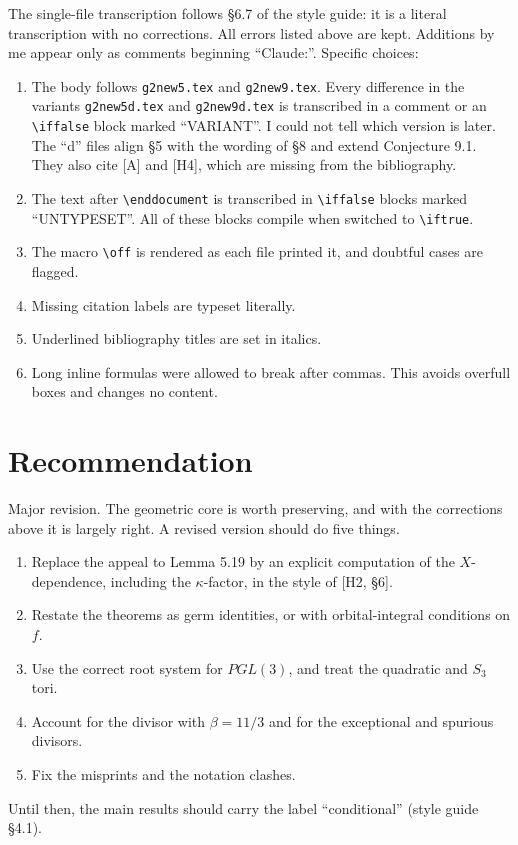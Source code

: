 \documentclass[12pt,letterpaper]{article}
\theoremstyle{definition}
\begin{document}
The single-file transcription follows \S6.7 of the style guide: it is a
literal transcription with no corrections. All errors listed above are kept.
Additions by me appear only as comments beginning ``Claude:''. Specific
choices:
\begin{enumerate}
\item The body follows \texttt{g2new5.tex} and \texttt{g2new9.tex}. Every
difference in the variants \texttt{g2new5d.tex} and \texttt{g2new9d.tex} is
transcribed in a comment or an \verb|\iffalse| block marked ``VARIANT''. I
could not tell which version is later. The ``d'' files align \S5 with the
wording of \S8 and extend Conjecture 9.1. They also cite [A] and [H4], which
are missing from the bibliography.
\item The text after \verb|\enddocument| is transcribed in \verb|\iffalse|
blocks marked ``UNTYPESET''. All of these blocks compile when switched to
\verb|\iftrue|.
\item The macro \verb|\off| is rendered as each file printed it, and doubtful
cases are flagged.
\item Missing citation labels are typeset literally.
\item Underlined bibliography titles are set in italics.
\item Long inline formulas were allowed to break after commas. This avoids
overfull boxes and changes no content.
\end{enumerate}

\section{Recommendation}

Major revision. The geometric core is worth preserving, and with the
corrections above it is largely right. A revised version should do five
things.
\begin{enumerate}
\item Replace the appeal to Lemma 5.19 by an explicit computation of the
$X$-dependence, including the $\kappa$-factor, in the style of [H2, \S6].
\item Restate the theorems as germ identities, or with orbital-integral
conditions on $f$.
\item Use the correct root system for $PGL(3)$, and treat the quadratic and
$S_3$ tori.
\item Account for the divisor with $\beta=11/3$ and for the exceptional and
spurious divisors.
\item Fix the misprints and the notation clashes.
\end{enumerate}
Until then, the main results should carry the label ``conditional'' (style
guide \S4.1).
\end{document}
